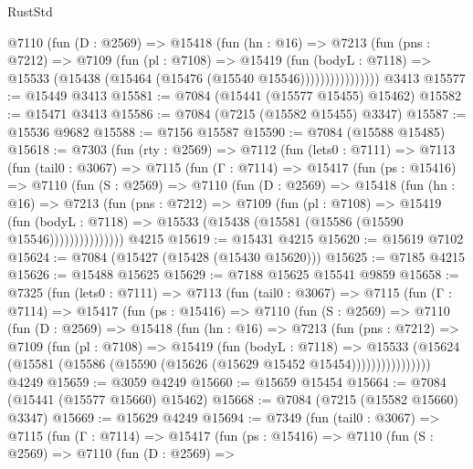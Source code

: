 \begin{lexlean}{RustStd}
\begin{coremodule}
                @7110
                  (fun (D : @2569) =>
                  @15418
                    (fun (hn : @16) =>
                    @7213
                      (fun (pns : @7212) =>
                      @7109
                        (fun (pl : @7108) =>
                        @15419
                          (fun (bodyL : @7118) =>
                          @15533 (@15438 (@15464 (@15476 (@15540 @15546))))))))))))))))
    @3413
@15577 := @15449 @3413
@15581 := @7084 (@15441 (@15577 @15455) @15462)
@15582 := @15471 @3413
@15586 := @7084 (@7215 (@15582 @15455) @3347)
@15587 := @15536 @9682
@15588 := @7156 @15587
@15590 := @7084 (@15588 @15485)
@15618 := @7303
    (fun (rty : @2569) =>
    @7112
      (fun (lets0 : @7111) =>
      @7113
        (fun (tail0 : @3067) =>
        @7115
          (fun (Γ : @7114) =>
          @15417
            (fun (ps : @15416) =>
            @7110
              (fun (S : @2569) =>
              @7110
                (fun (D : @2569) =>
                @15418
                  (fun (hn : @16) =>
                  @7213
                    (fun (pns : @7212) =>
                    @7109
                      (fun (pl : @7108) =>
                      @15419
                        (fun (bodyL : @7118) =>
                        @15533 (@15438 (@15581 (@15586 (@15590 @15546)))))))))))))))
    @4215
@15619 := @15431 @4215
@15620 := @15619 @7102
@15624 := @7084 (@15427 (@15428 (@15430 @15620)))
@15625 := @7185 @4215
@15626 := @15488 @15625
@15629 := @7188 @15625 @15541 @9859
@15658 := @7325
    (fun (lets0 : @7111) =>
    @7113
      (fun (tail0 : @3067) =>
      @7115
        (fun (Γ : @7114) =>
        @15417
          (fun (ps : @15416) =>
          @7110
            (fun (S : @2569) =>
            @7110
              (fun (D : @2569) =>
              @15418
                (fun (hn : @16) =>
                @7213
                  (fun (pns : @7212) =>
                  @7109
                    (fun (pl : @7108) =>
                    @15419
                      (fun (bodyL : @7118) =>
                      @15533
                        (@15624
                          (@15581 (@15586 (@15590 (@15626 (@15629 @15452 @15454))))))))))))))))
    @4249
@15659 := @3059 @4249
@15660 := @15659 @15454
@15664 := @7084 (@15441 (@15577 @15660) @15462)
@15668 := @7084 (@7215 (@15582 @15660) @3347)
@15669 := @15629 @4249
@15694 := @7349
    (fun (tail0 : @3067) =>
    @7115
      (fun (Γ : @7114) =>
      @15417
        (fun (ps : @15416) =>
        @7110
          (fun (S : @2569) =>
          @7110
            (fun (D : @2569) =>

\end{coremodule}
\end{lexlean}
